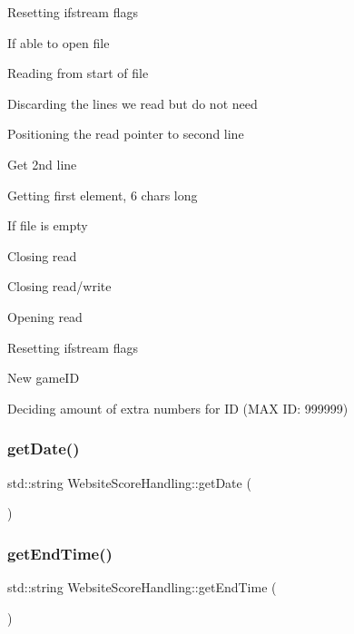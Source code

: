 Resetting ifstream flags

If able to open file

Reading from start of file

Discarding the lines we read but do not need

Positioning the read pointer to second line

Get 2nd line

Getting first element, 6 chars long

If file is empty

Closing read

Closing read/write

Opening read

Resetting ifstream flags

New game\+ID

Deciding amount of extra numbers for ID (M\+AX ID\+: 999999) \mbox{\label{class_website_score_handling_adf5d617f2dfe1eb846eb3e008348f685}} 
\subsubsection{\texorpdfstring{get\+Date()}{getDate()}}
{\footnotesize\ttfamily std\+::string Website\+Score\+Handling\+::get\+Date (\begin{DoxyParamCaption}{ }\end{DoxyParamCaption})\hspace{0.3cm}{\ttfamily [private]}}

\mbox{\label{class_website_score_handling_a06e4bba446c2b438fc2bfc52b2a6176e}} 
\subsubsection{\texorpdfstring{get\+End\+Time()}{getEndTime()}}
{\footnotesize\ttfamily std\+::string Website\+Score\+Handling\+::get\+End\+Time (\begin{DoxyParamCaption}{ }\end{DoxyParamCaption})\hspace{0.3cm}{\ttfamily [private]}}

